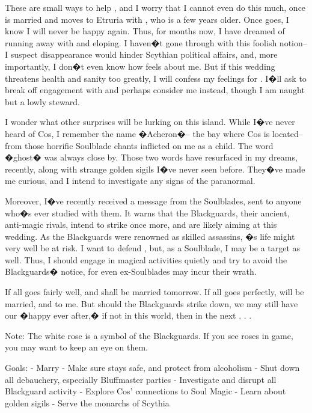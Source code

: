 \documentclass[char]{Kos}
\begin{document}
These are small ways to help \cBride{\nickname}, and I worry that I cannot even do this much, once \cBride{\they} is married and moves to Etruria with \cGroom{\nickname}, who is a few years older. Once \cBride{\they} goes, I know I will never be happy again. Thus, for months now, I have dreamed of running away with \cBride{\nickname} and eloping. I haven�t gone through with this foolish notion-- I suspect \cBride{\their} disappearance would hinder Scythian political affairs, and, more importantly, I don�t even know how \cBride{\nickname} feels about me. But if this wedding threatens \cBride{\their} health and sanity too greatly, I will confess my feelings for \cBride{\them}. I�ll ask \cBride{\them} to break off \cBride{\their} engagement with \cGroom{\nickname} and perhaps consider me instead, though I am naught but a lowly steward. 

I wonder what other surprises will be lurking on this island. While I�ve never heard of Cos, I remember the name �Acheron�-- the bay where Cos is located-- from those horrific Soulblade chants inflicted on me as a child. The word �ghost� was always close by. Those two words have resurfaced in my dreams, recently, along with strange golden sigils I�ve never seen before. They�ve made me curious, and I intend to investigate any signs of the paranormal.

Moreover, I�ve recently received a message from the Soulblades, sent to anyone who�s ever studied with them. It warns that the Blackguards, their ancient, anti-magic rivals, intend to strike once more, and are likely aiming at this wedding. As the Blackguards were renowned as skilled assassins, \cBride{\nickname}�s life might very well be at risk. I want to defend \cBride{\them}, but, as a Soulblade, I may be a target as well. Thus, I should engage in magical activities quietly and try to avoid the Blackguards� notice, for even ex-Soulblades may incur their wrath.

If all goes fairly well, \cBride{\nickname} and \cGroom{\nickname} shall be married tomorrow. If all goes perfectly, \cBride{\nickname} will be married, and to me. But should the Blackguards strike \cBride{\them} down, we may still have our �happy ever after,� if not in this world, then in the next . . .

Note: The white rose is a symbol of the Blackguards. If you see roses in game, you may want to keep an eye on them.

Goals:
- Marry \cBride{\nickname}
- Make sure \cBride{\nickname} stays safe, and protect \cBride{\them} from alcoholism
- Shut down all debauchery, especially Bluffmaster parties
- Investigate and disrupt all Blackguard activity
- Explore Cos' connections to Soul Magic
- Learn about golden sigils
- Serve the monarchs of Scythia
\end{document}
